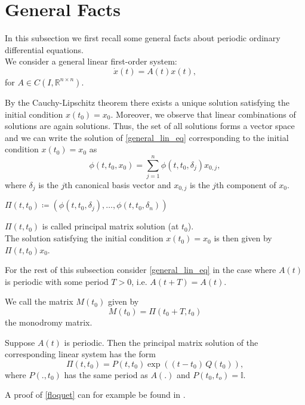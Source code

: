 \section{General Facts}
In this subsection we first recall some general facts about periodic ordinary differential equations.\\
We consider a general linear first-order system:
\begin{equation}\label{general_lin_eq}
    \dot{x}(t) = A(t)x(t),
\end{equation}
for $A \in C(I,\mathbb{R}^{n \times n})$.\par
By the Cauchy-Lipschitz theorem there exists a unique solution satisfying the initial condition $x(t_0) = x_0$. Moreover, we observe that linear combinations of solutions are again solutions. Thus, the set of all solutions forms a vector space and we can write the solution of \eqref{general_lin_eq} corresponding to the initial condition $x(t_0) = x_0$ as
\[ \phi(t,t_0,x_0) = \sum_{j=1}^{n} \phi(t,t_0,\delta_j) x_{0,j}, \]
where $\delta_j$ is the $j$th canonical basis vector and $x_{0,j}$ is the $j$th component of $x_0$.

$\Pi(t,t_0) \coloneqq (\phi(t,t_0,\delta_j),\dots , \phi(t,t_0,\delta_n))$

\begin{defn}
    $\Pi(t,t_0)$ is called principal matrix solution (at $t_0$).\\ 
    The solution satisfying the initial condition $x(t_0)=x_0$ is then given by $\Pi(t,t_0)x_0$.
\end{defn}

For the rest of this subsection consider \eqref{general_lin_eq} in the case where $A(t)$ is periodic with some period $T > 0$, i.e. $A(t+T) = A(t)$.

\begin{defn}
    We call the matrix $M(t_0)$ given by
    \[ M(t_0) = \Pi(t_0+T,t_0)\]
    the monodromy matrix.
\end{defn}

\begin{thm}[Floquet]\label{floquet}
    Suppose $A(t)$ is periodic. Then the principal matrix solution of the corresponding linear system has the form
    \[ \Pi(t,t_0) = P(t,t_0) \exp((t-t_0) \,Q(t_0)), \]
    where $P(.,t_0)$ has the same period as $A(.)$ and $P(t_0,t_o) = \mathbb{I}$.
\end{thm}

A proof of \eqref{floquet} can for example be found in \cite{teschl2012ordinary}.

